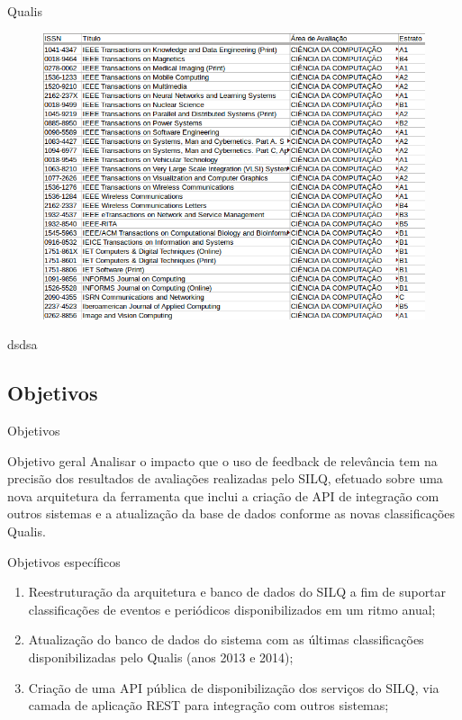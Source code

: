 \documentclass{beamer}
\begin{document}
\begin{frame}{Qualis}
  \begin{figure}
    \includegraphics[scale=0.4]{figuras/qualis_exemplo.png}
  \end{figure}
\end{frame}

\begin{frame}
  dsdsa
\end{frame}

\subsection{Objetivos}

\begin{frame}{Objetivos}
  \begin{block}{Objetivo geral}
    Analisar o impacto que o uso de feedback de relevância tem na precisão dos resultados de avaliações realizadas pelo SILQ, efetuado sobre uma nova arquitetura da ferramenta que inclui a criação de API de integração com outros sistemas e a atualização da base de dados conforme as novas classificações Qualis.
  \end{block}
\end{frame}

\begin{frame}{Objetivos específicos}
  \begin{enumerate}[<+->]
    \item Reestruturação da arquitetura e banco de dados do SILQ a fim de suportar classificações de eventos e periódicos disponibilizados em um ritmo anual;

    \item Atualização do banco de dados do sistema com as últimas classificações disponibilizadas pelo Qualis (anos 2013 e 2014);

    \item Criação de uma API pública de disponibilização dos serviços do SILQ, via camada de aplicação REST para integração com outros sistemas;
  \end{enumerate}
\end{frame}
\end{document}
